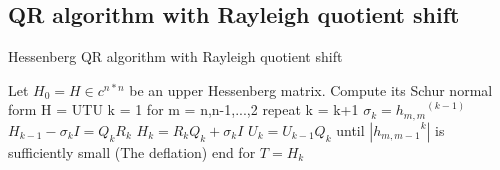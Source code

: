 \subsection{QR algorithm with Rayleigh quotient shift}
\begin{algorithm}
\caption{Hessenberg QR algorithm with Rayleigh quotient shift}
    \begin{algorithmic}
        \STATE Let \(H_0 = H \in c^{n*n} \) be an upper Hessenberg matrix. Compute its Schur normal form H = UTU
        \STATE k = 1
        \STATE for m = n,n-1,...,2 repeat
        \STATE \quad k = k+1
        \STATE \quad \(\sigma_k = {h_{m,m}}^(k-1)\)
        \STATE \quad \(H_{k-1}-\sigma_k I = Q_kR_k\)
        \STATE \quad \(H_k = R_kQ_k + \sigma_k I\)
        \STATE \quad \(U_k = U_{k-1}Q_k\)
        \STATE \quad until \(|{h_{m,m-1}}^k|\) is sufficiently small (The deflation)
        \STATE end for
        \STATE \(T = H_k\)
    \end{algorithmic}
\end{algorithm}




